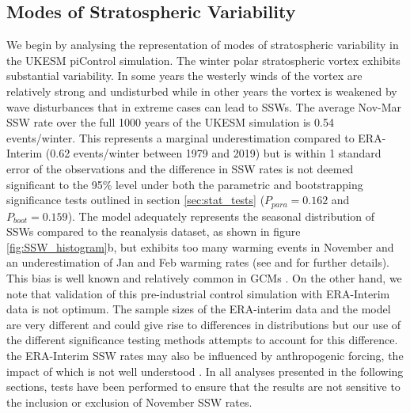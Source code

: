 \subsection{Modes of Stratospheric Variability}
\label{sec:strat_var_UKESM}
We begin by analysing the representation of modes of stratospheric variability in the UKESM piControl simulation. The winter polar stratospheric vortex  exhibits substantial variability. In some years the westerly winds of the vortex are relatively strong and undisturbed while in other years the vortex is weakened by wave disturbances that in extreme cases can lead to SSWs. The average Nov-Mar SSW rate over the full 1000 years of the UKESM simulation is 0.54 events/winter. This represents a marginal underestimation compared to ERA-Interim (0.62 events/winter between 1979 and 2019) but is within 1 standard error of the observations and the difference in SSW rates is not deemed significant to the 95\% level under both the parametric and bootstrapping significance tests outlined in section \ref{sec:stat_tests} ($P_{para} = 0.162$ and $P_{boot} = 0.159$). The model adequately represents the seasonal distribution of SSWs compared to the reanalysis dataset, as shown in figure \ref{fig:SSW_histogram}b, but exhibits too many warming events in November and an underestimation of Jan and Feb warming rates (see \cite{Andrews2020} and \cite{Menary2018} for further details). This bias is well known and relatively common in GCMs \citep{Charlton2007, Ayarz2020}. On the other hand, we note that validation of this pre-industrial control simulation with ERA-Interim data is not optimum. The sample sizes of the ERA-interim data and the model are very different and could give rise to differences in distributions \citep{Horan2017} but our use of the different significance testing methods attempts to account for this difference. the ERA-Interim SSW rates may also be influenced by anthropogenic forcing, the impact of which is not well understood \citep{Ayarz2020}. In all analyses presented in the following sections, tests have been performed to ensure that the results are not sensitive to the inclusion or exclusion of November SSW rates. 

